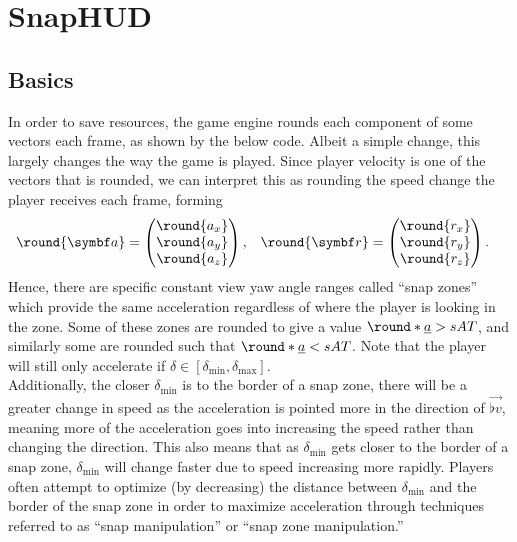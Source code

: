 \section{SnapHUD}
\label{sec:snaphud}

\subsection{Basics}
\label{sec:snap_basics}
In order to save resources, the game engine rounds each component of some vectors each frame, as shown by the below code. Albeit a simple change, this largely changes the way the game is played.
Since player velocity is one of the vectors that is rounded, we can interpret this as rounding the speed change the player receives each frame, forming
\begin{align*}
\round{\vec{a}} &=
\begin{pmatrix}
\round{a_x} \\ \round{a_y} \\ \round{a_z}
\end{pmatrix}, & \round{\vec{r}} &=
\begin{pmatrix}
\round{r_x} \\ \round{r_y} \\ \round{r_z}
\end{pmatrix}.
\end{align*}
Hence, there are specific constant view yaw angle ranges called ``snap zones'' which provide the same acceleration regardless of where the player is looking in the zone.
Some of these zones are rounded to give a value $\round*{\flat{a}} > sAT$, and similarly some are rounded such that $\round*{\flat{a}} < sAT$.
Note that the player will still only accelerate if $\delta \in [\delta_{\min}, \delta_{\max}]$.\\
Additionally, the closer $\delta_{\min}$ is to the border of a snap zone, there will be a greater change in speed as the acceleration is pointed more in the direction of $\vec{\flat{v}}$, meaning more of the acceleration goes into increasing the speed rather than changing the direction.
This also means that as $\delta_{\min}$ gets closer to the border of a snap zone, $\delta_{\min}$ will change faster due to speed increasing more rapidly.
Players often attempt to optimize (by decreasing) the distance between $\delta_{\min}$ and the border of the snap zone in order to maximize acceleration through techniques referred to as ``snap manipulation'' or ``snap zone manipulation.''\\

